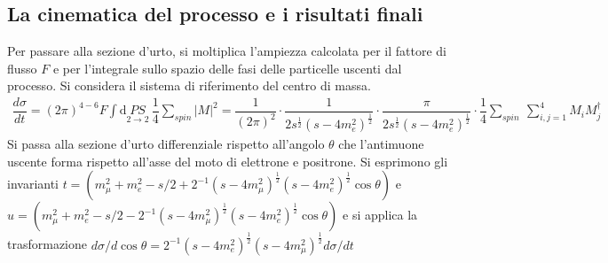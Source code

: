 \documentclass[11pt]{article}
\begin{document}
    \subsection*{La cinematica del processo e i risultati finali}
    Per passare alla sezione d'urto, si moltiplica l'ampiezza calcolata per il fattore di flusso $F$ e per l'integrale sullo spazio delle fasi delle particelle uscenti dal processo. Si considera il sistema di riferimento del centro di massa.
    \begin{equation}
	\begin{split}
	\dfrac{d\sigma}{dt} = \left(2\pi\right)^{4-6}F \int \mathrm{d}\underset{2\to2}{PS}\ \dfrac{1}{4}\sum_{spin}\lvert M\rvert^2 = \dfrac{1}{\left(2\pi\right)^{2}} \cdot \dfrac{1}{2s^{\frac{1}{2}}(s-4m_e^2)^{\frac{1}{2}} } \cdot \dfrac{\pi}{2s^{\frac{1}{2}}(s-4m_e^2)^{\frac{1}{2}} } \cdot \dfrac{1}{4}\sum_{spin}\ \sum_{i,j=1}^{4} M_i M_j^{\dagger}
	\end{split}
	\end{equation}
    Si passa alla sezione d'urto differenziale rispetto all'angolo $\theta$ che l'antimuone uscente forma rispetto all'asse del moto di elettrone e positrone. Si esprimono gli invarianti $t=(m_\mu^2+m_e^2-s/2+2^{-1}(s-4m_\mu^2)^{\frac{1}{2}}(s-4m_e^2)^{\frac{1}{2}}\cos\theta)$
    e $u=(m_\mu^2+m_e^2-s/2-2^{-1}(s-4m_\mu^2)^{\frac{1}{2}}(s-4m_e^2)^{\frac{1}{2}}\cos\theta)$ e si applica la trasformazione $d\sigma/d\cos\theta=2^{-1}(s-4m_e^2)^{\frac{1}{2}}(s-4m_\mu^2)^{\frac{1}{2}}d\sigma/dt$
\end{document}
